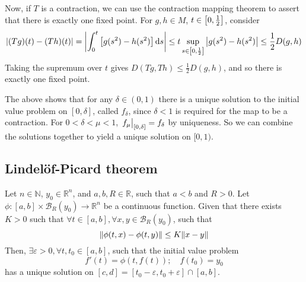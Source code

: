 Now, if \( T \) is a contraction, we can use the contraction mapping theorem to assert that there is exactly one fixed point.
For \( g,h \in M \), \( t \in \qty[0, \frac{1}{2}] \), consider
\[
	\abs{(Tg)(t) - (Th)(t)} = \abs{\int_0^t \qty[g(s^2) - h(s^2)] \dd{s}} \leq t \sup_{s \in \qty[0, \frac{1}{2}]} \abs{g(s^2) - h(s^2)} \leq \frac{1}{2} D(g,h)
\]
Taking the supremum over \( t \) gives \( D(Tg, Th) \leq \frac{1}{2} D(g,h) \), and so there is exactly one fixed point.
\begin{remark}
	The above shows that for any \( \delta \in (0, 1) \) there is a unique solution to the initial value problem on \( [0, \delta] \), called \( f_\delta \), since \( \delta < 1 \) is required for the map to be a contraction.
	For \( 0 < \delta < \mu < 1 \), \( \eval{f_\mu}_{[0,\delta]} = f_\delta \) by uniqueness.
	So we can combine the solutions together to yield a unique solution on \( [0,1) \).
\end{remark}

\subsection{Lindel\"of-Picard theorem}
\begin{theorem}
	Let \( n \in \mathbb N \), \( y_0 \in \mathbb R^n \), and \( a,b,R \in \mathbb R \), such that \( a < b \) and \( R > 0 \).
	Let \( \phi \colon [a,b] \times \mathcal B_R(y_0) \to \mathbb R^n \) be a continuous function.
	Given that there exists \( K > 0 \) such that \( \forall t \in [a,b], \forall x,y \in \mathcal B_R(y_0) \), such that
	\[
		\norm{\phi(t,x) - \phi(t,y)} \leq K \norm{x-y}
	\]
	Then, \( \exists \varepsilon > 0, \forall t, t_0 \in [a,b] \), such that the initial value problem
	\[
		f'(t) = \phi(t, f(t));\quad f(t_0) = y_0
	\]
	has a unique solution on \( [c,d] = [t_0 - \varepsilon, t_0 + \varepsilon] \cap [a,b] \).
\end{theorem}
